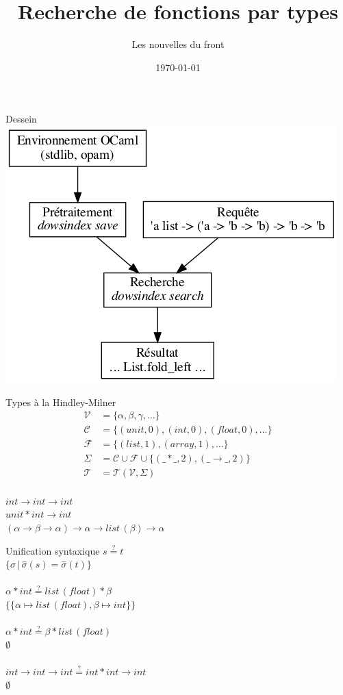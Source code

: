 \documentclass[serif]{beamer}
\title{Recherche de fonctions par types}
\subtitle{Les nouvelles du front}
\date{\today}
\newcommand{\?}{\stackrel{?}{=}}
\begin{document}
\begin{frame}
  \titlepage
\end{frame}


\begin{frame}{Dessein}
  \includegraphics[scale=0.5,center]{graphs/dessein}
\end{frame}


\begin{frame}{Types à la Hindley-Milner}
  \centering
  \large
  \begin{align*}
    \mathscr V &= \{ \alpha, \beta, \gamma, \dots \} \\
    \mathscr C &= \{ (unit, 0), (int, 0), (float, 0), \dots \} \\
    \mathscr F &= \{ (list, 1), (array, 1), \dots \} \\
    \Sigma &= \mathscr C \cup \mathscr F \cup \{ (\_\!*\!\_, 2), (\_\!\rightarrow\!\_, 2) \} \\
    \mathscr T &= \mathscr T (\mathscr V, \Sigma)
  \end{align*}
  ~\\
  $int \rightarrow int \rightarrow int$ \\
  $unit * int \rightarrow int$ \\
  $(\alpha \rightarrow \beta \rightarrow \alpha) \rightarrow \alpha \rightarrow list\,(\beta) \rightarrow \alpha$
\end{frame}


\begin{frame}{Unification syntaxique}
  \centering
  \large
  $s \? t$ \\
  $\{ \sigma \,|\, \hat \sigma (s) = \hat \sigma (t) \}$ \\
  ~\\
  $\alpha * int \? list\,(float) * \beta$ \\
  $\{ \{ \alpha \mapsto list\,(float), \beta \mapsto int \} \}$ \\
  ~\\
  $\alpha * int \? \beta * list\,(float)$ \\
  $\emptyset$ \\
  ~\\
  $int \rightarrow int \rightarrow int \? int * int \rightarrow int$ \\
  $\emptyset$
\end{frame}
\end{document}
